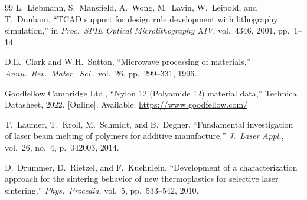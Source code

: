 \documentclass[10pt,twocolumn]{article}
\begin{document}
\begin{thebibliography}{99}
L.~Liebmann, S.~Mansfield, A.~Wong, M.~Lavin, W.~Leipold, and
T.~Dunham,
``TCAD support for design rule development with lithography
simulation,''
in \textit{Proc.\ SPIE Optical Microlithography XIV},
vol.~4346, 2001, pp.~1--14.

D.E.~Clark and W.H.~Sutton,
``Microwave processing of materials,''
\textit{Annu.\ Rev.\ Mater.\ Sci.}, vol.~26, pp.~299--331, 1996.

Goodfellow Cambridge Ltd.,
``Nylon 12 (Polyamide 12) material data,''
Technical Datasheet, 2022.
[Online]. Available: \url{https://www.goodfellow.com/}

T.~Laumer, T.~Kroll, M.~Schmidt, and B.~Degner,
``Fundamental investigation of laser beam melting of polymers for
additive manufacture,''
\textit{J.\ Laser Appl.}, vol.~26, no.~4, p.~042003, 2014.

D.~Drummer, D.~Rietzel, and F.~Kuehnlein,
``Development of a characterization approach for the sintering behavior
of new thermoplastics for selective laser sintering,''
\textit{Phys.\ Procedia}, vol.~5, pp.~533--542, 2010.

\end{thebibliography}
\end{document}
